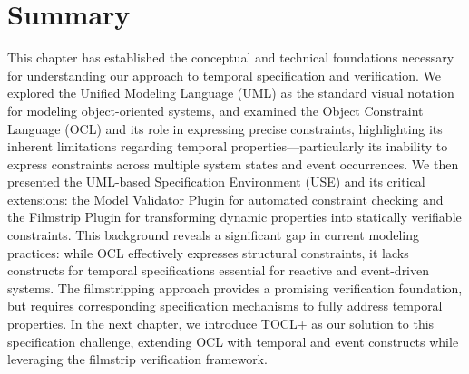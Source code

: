 \section{Summary}
\hspace{1cm} This chapter has established the conceptual and technical foundations necessary for understanding our approach to temporal specification and verification. We explored the Unified Modeling Language (UML) as the standard visual notation for modeling object-oriented systems, and examined the Object Constraint Language (OCL) and its role in expressing precise constraints, highlighting its inherent limitations regarding temporal properties—particularly its inability to express constraints across multiple system states and event occurrences. We then presented the UML-based Specification Environment (USE) and its critical extensions: the Model Validator Plugin for automated constraint checking and the Filmstrip Plugin for transforming dynamic properties into statically verifiable constraints. This background reveals a significant gap in current modeling practices: while OCL effectively expresses structural constraints, it lacks constructs for temporal specifications essential for reactive and event-driven systems. The filmstripping approach provides a promising verification foundation, but requires corresponding specification mechanisms to fully address temporal properties. In the next chapter, we introduce TOCL+ as our solution to this specification challenge, extending OCL with temporal and event constructs while leveraging the filmstrip verification framework.